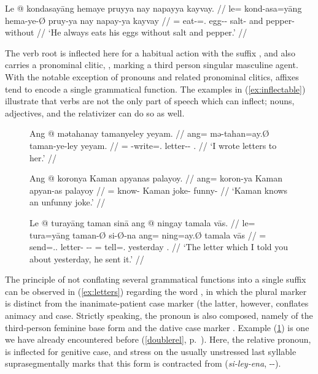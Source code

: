 \ex\label{ex:suffixation}%
\begingl
	\gla Le @ kondasayāng hemaye pruyya nay napayya kayvay. //
	\glb le= kond-asa=yāng hema-ye-Ø pruy-ya nay napay-ya kayvay //
	\glc \PatTI{}= eat-\Hab{}=\TsgM{}.\Aarg{} egg-\Pl{}-\Top{} salt-\Loc{} 
		and pepper-\Loc{} without //
	\glft `He always eats his eggs without salt and pepper.' //
\endgl\xe

The verb root  is inflected here for a habitual action
with the suffix , and also carries a pronominal
clitic, , marking a third person singular
masculine agent. With the notable exception of pronouns and related pronominal
clitics, affixes tend to encode a single grammatical function. The examples in
(\ref{ex:inflectable}) illustrate that verbs are not the only part of speech
which can inflect; nouns, adjectives, and the relativizer can do
so as well.

\begin{figure}
\pex\label{ex:inflectable}
\a\label{ex:letters}\begingl
	\gla Ang @ mətahanay tamanyeley yeyam. //
	\glb ang= mə-tahan=ay.Ø taman-ye-ley yeyam. //
	\glc \AgtT{}= \Pst{}-write=\Fsg{}.\Top{} letter-\Pl{}-\PargI{} 
		\TsgF{}.\Dat{} //
	\glft `I wrote letters to her.' //
\endgl

\a\label{ex:adjinfl}\begingl
	\gla Ang @ koronya Kaman apyanas palayoy. //
	\glb ang= koron-ya Kaman apyan-as palayoy //
	\glc \AgtT{}= know-\TsgM{} Kaman joke-\Parg{} funny-\Neg{} //
	\glft `Kaman knows an unfunny joke.' //
\endgl

\a\label{ex:relative}\begingl
	\gla Le @ turayāng taman sinā ang @ ningay tamala vās. //
	\glb le= tura=yāng taman-Ø si-Ø-na ang= ning=ay.Ø tamala vās //
	\glc \PatTI{}= send=\Tsg{}.\M{}.\Aarg{} letter-\Top{} 
		\Rel{}-\PatTI{}-\Gen{} \AgtT{}= tell=\Fsg{}.\Top{} yesterday 
		\Ssg{}.\Parg{} //
	\glft `The letter which I told you about yesterday, he sent it.' //
\endgl
\xe
\end{figure}

The principle of not conflating several grammatical functions into a single
suffix can be observed in (\ref{ex:letters}) regarding the word
, in which the plural marker 
 is distinct from the inanimate-patient case marker 
 (the latter, however, conflates animacy and case. Strictly 
speaking, the pronoun  is also composed, namely of
the third-person feminine base form  and the dative case marker
. Example (\ref{ex:relative}) is one we have already 
encountered before (\autoref{doublerel}, p.~\pageref{doublerel}). Here, the
relative pronoun,  is inflected for genitive
case, and stress on the usually unstressed last syllable
suprasegmentally marks that this form is
contracted from  (\textit{si-ley-ena},
\Rel{}-\PargI{}-\Gen{}).

